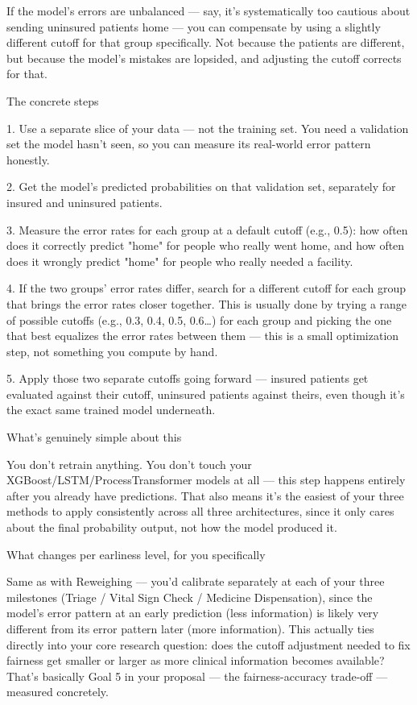 \documentclass[authoryear,preprint,12pt]{elsarticle}
\begin{document}
If the model's errors are unbalanced — say, it's systematically too cautious about sending uninsured patients home — you can compensate by using a slightly different cutoff for that group specifically. Not because the patients are different, but because the model's mistakes are lopsided, and adjusting the cutoff corrects for that.

The concrete steps

1. Use a separate slice of your data — not the training set. You need a validation set the model hasn't seen, so you can measure its real-world error pattern honestly.

2. Get the model's predicted probabilities on that validation set, separately for insured and uninsured patients.

3. Measure the error rates for each group at a default cutoff (e.g., 0.5): how often does it correctly predict "home" for people who really went home, and how often does it wrongly predict "home" for people who really needed a facility.

4. If the two groups' error rates differ, search for a different cutoff for each group that brings the error rates closer together. This is usually done by trying a range of possible cutoffs (e.g., 0.3, 0.4, 0.5, 0.6…) for each group and picking the one that best equalizes the error rates between them — this is a small optimization step, not something you compute by hand.

5. Apply those two separate cutoffs going forward — insured patients get evaluated against their cutoff, uninsured patients against theirs, even though it's the exact same trained model underneath.

What's genuinely simple about this

You don't retrain anything. You don't touch your XGBoost/LSTM/ProcessTransformer models at all — this step happens entirely after you already have predictions. That also means it's the easiest of your three methods to apply consistently across all three architectures, since it only cares about the final probability output, not how the model produced it.

What changes per earliness level, for you specifically

Same as with Reweighing — you'd calibrate separately at each of your three milestones (Triage / Vital Sign Check / Medicine Dispensation), since the model's error pattern at an early prediction (less information) is likely very different from its error pattern later (more information). This actually ties directly into your core research question: does the cutoff adjustment needed to fix fairness get smaller or larger as more clinical information becomes available? That's basically Goal 5 in your proposal — the fairness-accuracy trade-off — measured concretely.
\end{document}
